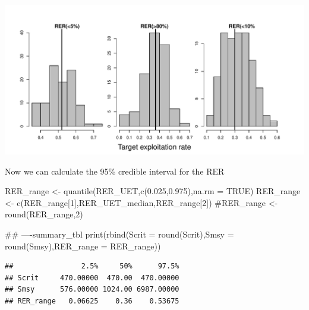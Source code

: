 \documentclass[
  11pt,
]{article}
\newenvironment{Shaded}{}{}
\newcommand{\CommentTok}[1]{\textcolor[rgb]{0.00,0.50,0.00}{#1}}
\newcommand{\DataTypeTok}[1]{#1}
\newcommand{\DecValTok}[1]{#1}
\newcommand{\FloatTok}[1]{#1}
\newcommand{\KeywordTok}[1]{\textcolor[rgb]{0.00,0.00,1.00}{#1}}
\newcommand{\NormalTok}[1]{#1}
\newcommand{\OtherTok}[1]{\textcolor[rgb]{1.00,0.25,0.00}{#1}}
\newcommand{\StringTok}[1]{\textcolor[rgb]{0.00,0.50,0.50}{#1}}
\begin{document}
\includegraphics{App_2_Summarize_results_Spring_Chinook_files/figure-latex/plot_RER_posterior_dist-1.pdf}

Now we can calculate the 95\% credible interval for the RER

\begin{Shaded}
\begin{Highlighting}[]
\NormalTok{RER_range <-}\StringTok{ }\KeywordTok{quantile}\NormalTok{(RER_UET,}\KeywordTok{c}\NormalTok{(}\FloatTok{0.025}\NormalTok{,}\FloatTok{0.975}\NormalTok{),}\DataTypeTok{na.rm =} \OtherTok{TRUE}\NormalTok{)}
\NormalTok{RER_range <-}\StringTok{ }\KeywordTok{c}\NormalTok{(RER_range[}\DecValTok{1}\NormalTok{],RER_UET_median,RER_range[}\DecValTok{2}\NormalTok{])}
\CommentTok{#RER_range <- round(RER_range,2)}

\CommentTok{## ----summary_tbl}
\KeywordTok{print}\NormalTok{(}\KeywordTok{rbind}\NormalTok{(}\DataTypeTok{Scrit =} \KeywordTok{round}\NormalTok{(Scrit),}\DataTypeTok{Smsy =} \KeywordTok{round}\NormalTok{(Smsy),}\DataTypeTok{RER_range =}\NormalTok{ RER_range))}
\end{Highlighting}
\end{Shaded}

\begin{verbatim}
##                2.5%     50%      97.5%
## Scrit     470.00000  470.00  470.00000
## Smsy      576.00000 1024.00 6987.00000
## RER_range   0.06625    0.36    0.53675
\end{verbatim}
\end{document}
